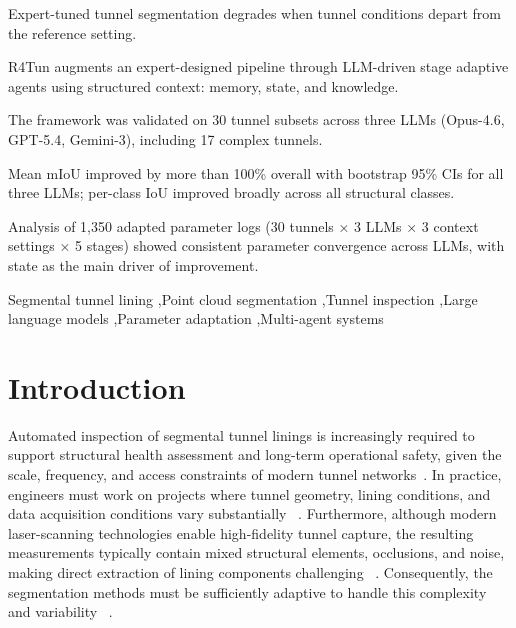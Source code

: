 \documentclass[a4paper,fleqn]{cas-dc}
\begin{document}

\begin{highlights}

\item Expert-tuned tunnel segmentation degrades when tunnel conditions depart from the reference setting.
\item R4Tun augments an expert-designed pipeline through LLM-driven stage adaptive agents using structured context: memory, state, and knowledge.
\item The framework was validated on 30 tunnel subsets across three LLMs (Opus-4.6, GPT-5.4, Gemini-3), including 17 complex tunnels.
\item Mean mIoU improved by more than 100\% overall with bootstrap 95\% CIs for all three LLMs; per-class IoU improved broadly across all structural classes.
\item Analysis of 1,350 adapted parameter logs (30 tunnels × 3 LLMs × 3 context settings × 5 stages) showed consistent parameter convergence across LLMs, with state as the main driver of improvement.

\end{highlights}


\begin{keywords}
Segmental tunnel lining \sep Point cloud segmentation \sep Tunnel inspection \sep Large language models \sep Parameter adaptation \sep Multi-agent systems
\end{keywords}

\maketitle

\smallskip

\section{Introduction}\label{sec:intro}


Automated inspection of segmental tunnel linings is increasingly required to support structural health assessment and long-term operational safety, given the scale, frequency, and access constraints of modern tunnel networks~\cite{attard2018}. In practice, engineers must work on projects where tunnel geometry, lining conditions, and data acquisition conditions vary substantially ~\cite{weidner2024generalized}. Furthermore, although modern laser-scanning technologies enable high-fidelity tunnel capture, the resulting measurements typically contain mixed structural elements, occlusions, and noise, making direct extraction of lining components challenging ~\cite{huang2021bim,sjolander2023towards}. Consequently, the segmentation methods must be sufficiently adaptive to handle this complexity and variability ~\cite{montero2015, strauss2020sensing, camuffo2022recent}. 
\end{document}

